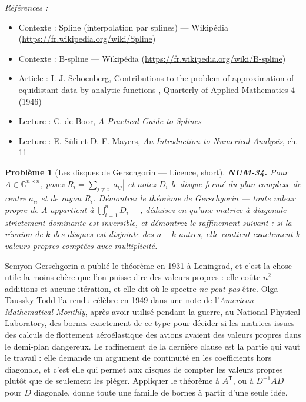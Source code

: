 \documentclass[11pt]{article}
\newtheorem{problem}{Problème}
\newenvironment{refs}{\par\small\noindent\emph{Références :}\begin{itemize}\setlength\itemsep{0pt}}{\end{itemize}\normalsize}
\begin{document}
\begin{refs}
\item Contexte : Spline (interpolation par splines) --- Wikipédia (\url{https://fr.wikipedia.org/wiki/Spline})
\item Contexte : B-spline --- Wikipédia (\url{https://fr.wikipedia.org/wiki/B-spline})
\item Article : I. J. Schoenberg, \og{} Contributions to the problem of approximation of equidistant data by analytic functions \fg{}, Quarterly of Applied Mathematics 4 (1946)
\item Lecture : C. de Boor, \textit{A Practical Guide to Splines}
\item Lecture : E. Süli et D. F. Mayers, \textit{An Introduction to Numerical Analysis}, ch. 11
\end{refs}

\bigskip

\begin{problem}[{Les disques de Gerschgorin --- Licence, short}]
\textbf{NUM-34.} Pour $A \in \mathbb{C}^{n \times n}$, posez $R_i = \sum_{j \ne i} |a_{ij}|$ et notez $D_i$ le disque fermé du plan complexe de centre $a_{ii}$ et de rayon $R_i$. Démontrez le théorème de Gerschgorin --- toute valeur propre de $A$ appartient à $\bigcup_{i=1}^{n} D_i$ ---, déduisez-en qu'une matrice à diagonale strictement dominante est inversible, et démontrez le raffinement suivant : si la réunion de $k$ des disques est disjointe des $n-k$ autres, elle contient exactement $k$ valeurs propres comptées avec multiplicité.
\end{problem}

\noindent Semyon Gerschgorin a publié le théorème en 1931 à Leningrad, et c'est la chose utile la moins chère que l'on puisse dire des valeurs propres : elle coûte $n^2$ additions et aucune itération, et elle dit où le spectre \textit{ne peut pas} être. Olga Taussky-Todd l'a rendu célèbre en 1949 dans une note de l'\textit{American Mathematical Monthly}, après avoir utilisé pendant la guerre, au National Physical Laboratory, des bornes exactement de ce type pour décider si les matrices issues des calculs de flottement aéroélastique des avions avaient des valeurs propres dans le demi-plan dangereux. Le raffinement de la dernière clause est la partie qui vaut le travail : elle demande un argument de continuité en les coefficients hors diagonale, et c'est elle qui permet aux disques de compter les valeurs propres plutôt que de seulement les piéger. Appliquer le théorème à $A^{\mathsf T}$, ou à $D^{-1}AD$ pour $D$ diagonale, donne toute une famille de bornes à partir d'une seule idée.
\end{document}
